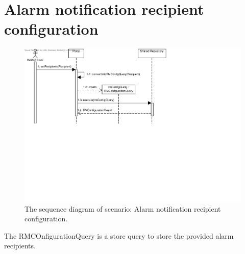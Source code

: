 \section{Alarm notification recipient configuration}

\begin{figure}[H]
	\begin{centering}
		\includegraphics[width=\textwidth]{figs/scenario-5-3-4.pdf}
		\caption{The sequence diagram of scenario: Alarm notification recipient configuration.}
		\label{fig:scenario-5-3-4}
	\end{centering}
\end{figure}

\npar The RMCOnfigurationQuery is a store query to store the provided alarm
recipients.
